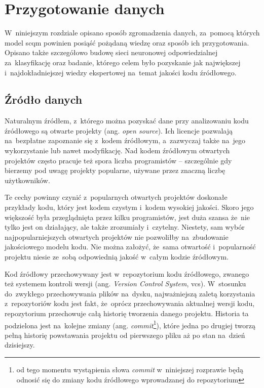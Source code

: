 \documentclass[twoside]{praca}
\begin{document}
\cleardoublepage
\chapter{Przygotowanie danych}
\label{ch:impl}

\begin{addmargin}{1cm}
W~niniejszym rozdziale opisano sposób zgromadzenia danych, za~pomocą których model \gls{scqm} powinien posiąść pożądaną wiedzę oraz sposób ich przygotowania. Opisano także szczegółowo budowę sieci neuronowej odpowiedzialnej za~klasyfikację oraz badanie, którego celem było pozyskanie jak największej i~najdokładniejszej wiedzy ekspertowej na~temat jakości kodu źródłowego.
\end{addmargin}

\section{Źródło danych}
\label{sec:impl:source}

Naturalnym źródłem, z~którego można pozyskać dane przy analizowaniu kodu źródłowego są otwarte projekty (ang. \textit{open source}). Ich licencje pozwalają na~bezpłatne zapoznanie się z~kodem źródłowym, a~zazwyczaj także na~jego wykorzystanie lub nawet modyfikację. Nad kodem źródłowym otwartych projektów często pracuje też spora liczba programistów -- szczególnie gdy bierzemy pod uwagę projekty popularne, używane przez znaczną liczbę użytkowników.

Te cechy powinny czynić z~popularnych otwartych projektów doskonałe przykłady kodu, który jest kodem czystym i~kodem wysokiej jakości. Skoro jego większość była przeglądnięta przez kilku programistów, jest duża szansa że~nie tylko jest on działający, ale także zrozumiały i~czytelny. Niestety, sam wybór najpopularniejszych otwartych projektów nie pozwoliłby na~zbudowanie jakościowego modelu kodu. Nie można założyć, że~sama otwartość i~popularność projektu niesie ze~sobą odpowiednią jakość w~całym kodzie źródłowym.

Kod źródłowy przechowywany jest w~repozytorium kodu źródłowego, zwanego też systemem kontroli wersji (ang. \textit{Version Control System}, \gls{vcs}). W~stosunku do~zwykłego przechowywania plików na~dysku, najważniejszą zaletą korzystania z~repozytoriów kodu jest fakt, że~oprócz przechowywania aktualnej wersji kodu, repozytorium przechowuje całą historię tworzenia danego projektu. Historia ta podzielona jest na~kolejne zmiany (ang. \textit{commit}\footnote{od tego momentu wystąpienia słowa \textit{commit} w~niniejszej rozprawie będą odnosić się do zmiany kodu źródłowego wprowadzanej do repozytorium}), które jedna po drugiej tworzą pełną historię powstawania projektu od pierwszego pliku aż po stan na~dzień dzisiejszy.
\end{document}
